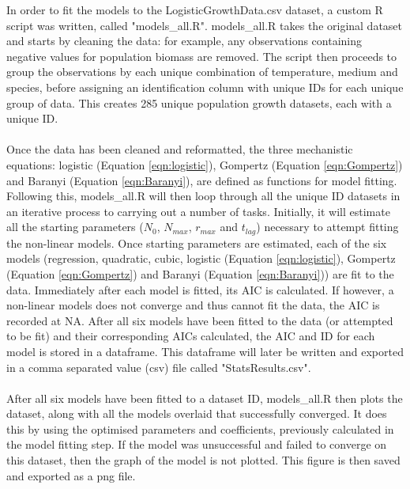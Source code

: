\documentclass[11pt, a4paper]{article} %
\begin{document}
In order to fit the models to the LogisticGrowthData.csv dataset, a custom R script was written, called "models\_all.R". models\_all.R takes the original dataset and starts by cleaning the data: for example, any observations containing negative values for population biomass are removed. The script then proceeds to group the observations by each unique combination of temperature, medium and species, before assigning an identification column with unique IDs for each unique group of data. This creates 285 unique population growth datasets, each with a unique ID. 
\paragraph{} Once the data has been cleaned and reformatted, the three mechanistic equations: logistic (Equation \ref{eqn:logistic}), Gompertz (Equation \ref{eqn:Gompertz}) and Baranyi (Equation \ref{eqn:Baranyi}), are defined as functions for model fitting. Following this, models\_all.R will then loop through all the unique ID datasets in an iterative process to carrying out a number of tasks. Initially, it will estimate all the starting parameters ($N_0$, $N_{max}$, $r_{max}$ and $t_{lag}$) necessary to attempt fitting the non-linear models. Once starting parameters are estimated, each of the six models (regression, quadratic, cubic, logistic (Equation \ref{eqn:logistic}), Gompertz (Equation \ref{eqn:Gompertz}) and Baranyi (Equation \ref{eqn:Baranyi})) are fit to the data. Immediately after each model is fitted, its AIC is calculated. If however, a non-linear models does not converge and thus cannot fit the data, the AIC is recorded at NA. After all six models have been fitted to the data (or attempted to be fit) and their corresponding AICs calculated, the AIC and ID for each model is stored in a dataframe. This dataframe will later be written and exported in a comma separated value (csv) file called "StatsResults.csv".
\paragraph{} After all six models have been fitted to a dataset ID,  models\_all.R then plots the dataset, along with all the models overlaid that successfully converged. It does this by using the optimised parameters and coefficients, previously calculated in the model fitting step. If the model was unsuccessful and failed to converge on this dataset, then the graph of the model is not plotted. This figure is then saved and exported as a png file.
\end{document}
